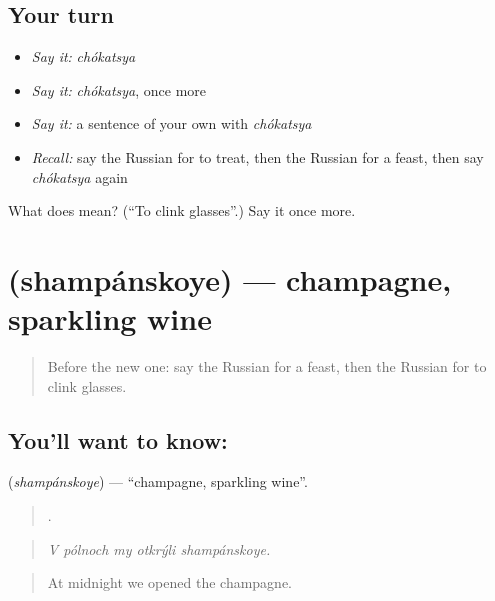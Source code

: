 \subsection*{Your turn}
\begin{itemize}
\raggedright
  \item \emph{Say it:} \emph{chókatsya}
  \item \emph{Say it:} \emph{chókatsya}, once more
  \item \emph{Say it:} a sentence of your own with \emph{chókatsya}
  \item \emph{Recall:} say the Russian for to treat, then the Russian for a feast, then say \emph{chókatsya} again
\end{itemize}

\begin{tcolorbox}[breakable,colback=teal!4,colframe=teal!35!black,title={Before you move on}]
What does  mean? (\textquotedblleft{}To clink glasses\textquotedblright{}.) Say it once more.
\end{tcolorbox}
\section[\texorpdfstring{\ru{шампанское} (shampánskoye)}{шампанское (shampánskoye)}]{ (shampánskoye) — champagne, sparkling wine}

\label{lesson:RU-C315-shampanskoye}



\begin{quote}
Before the new one: say the Russian for a feast, then the Russian for to clink glasses.
\end{quote}

\subsection*{You'll want to know: }
\textbf{} (\emph{shampánskoye}) — \textquotedblleft{}champagne, sparkling wine\textquotedblright{}.

\begin{quote}
    .
\end{quote}

\begin{quote}
\emph{V pólnoch my otkrýli shampánskoye.}
\end{quote}

\begin{quote}
At midnight we opened the champagne.
\end{quote}

